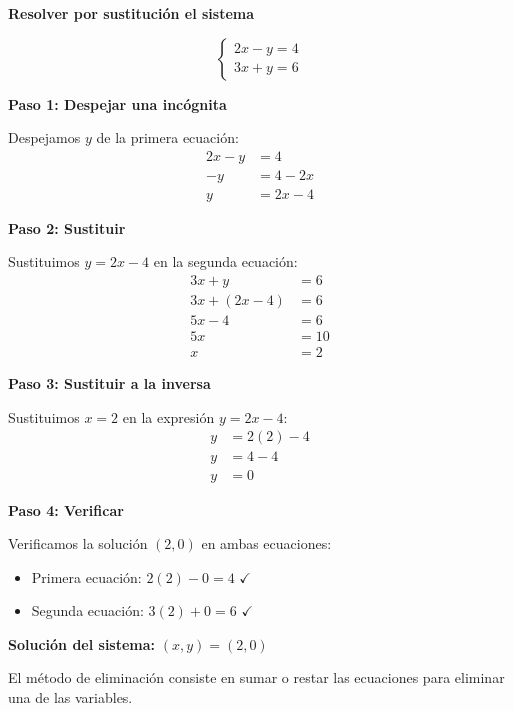\begin{example}
\textbf{Resolver por sustitución el sistema}

$$\begin{cases}
2x - y = 4 \\
3x + y = 6
\end{cases}$$

\textbf{Paso 1: Despejar una incógnita}

Despejamos $y$ de la primera ecuación:
\begin{align*}
2x - y &= 4 \\
-y &= 4 - 2x \\
y &= 2x - 4
\end{align*}

\textbf{Paso 2: Sustituir}

Sustituimos $y = 2x - 4$ en la segunda ecuación:
\begin{align*}
3x + y &= 6 \\
3x + (2x - 4) &= 6 \\
5x - 4 &= 6 \\
5x &= 10 \\
x &= 2
\end{align*}

\textbf{Paso 3: Sustituir a la inversa}

Sustituimos $x = 2$ en la expresión $y = 2x - 4$:
\begin{align*}
y &= 2(2) - 4 \\
y &= 4 - 4 \\
y &= 0
\end{align*}

\textbf{Paso 4: Verificar}

Verificamos la solución $(2, 0)$ en ambas ecuaciones:
\begin{itemize}
    \item Primera ecuación: $2(2) - 0 = 4$ \quad $\checkmark$
    \item Segunda ecuación: $3(2) + 0 = 6$ \quad $\checkmark$
\end{itemize}

\textbf{Solución del sistema:} $(x, y) = (2, 0)$
\end{example}

\newpage

El método de eliminación consiste en sumar o restar las ecuaciones para eliminar una de las variables.

